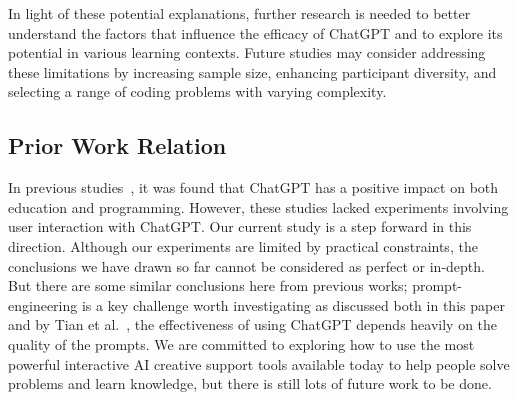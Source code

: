 \documentclass[manuscript,screen,nonacm]{acmart}
\begin{document}
In light of these potential explanations, further research is needed to better understand the factors that influence the efficacy of ChatGPT and to explore its potential in various learning contexts. Future studies may consider addressing these limitations by increasing sample size, enhancing participant diversity, and selecting a range of coding problems with varying complexity.

\subsection{Prior Work Relation}\label{Prior}

In previous studies~\cite{fraiwan2023review, sobania2023analysis, tian2023chatgpt}, it was found that ChatGPT has a positive impact on both education and programming. However, these studies lacked experiments involving user interaction with ChatGPT. Our current study is a step forward in this direction. Although our experiments are limited by practical constraints, the conclusions we have drawn so far cannot be considered as perfect or in-depth. 
But there are some similar conclusions here from previous works; prompt-engineering is a key challenge worth investigating as discussed both in this paper and by Tian et al.~\cite{tian2023chatgpt}, the effectiveness of using ChatGPT depends heavily on the quality of the prompts. We are committed to exploring how to use the most powerful interactive AI creative support tools available today to help people solve problems and learn knowledge, but there is still lots of future work to be done.
\end{document}
